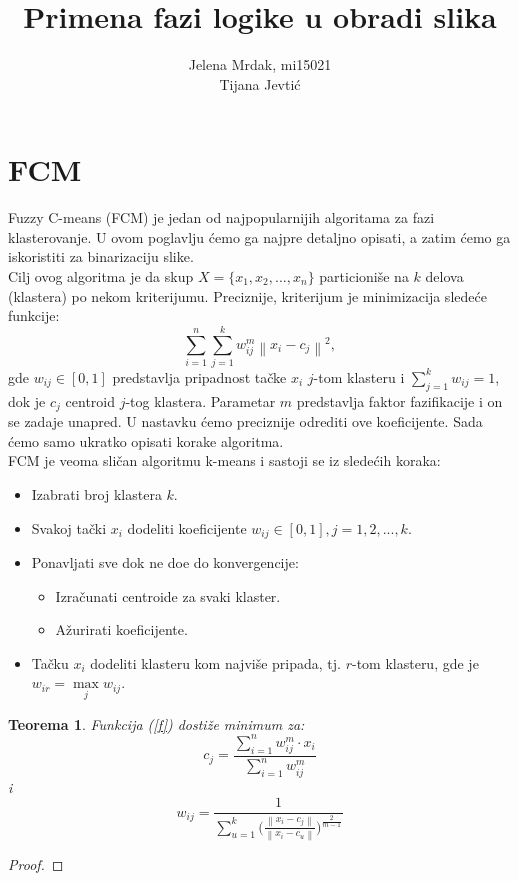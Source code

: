 \documentclass[12pt,a4paper]{article}
\title{Primena fazi logike u obradi slika}
\author{Jelena Mrdak, mi15021\\ Tijana Jevti\' c}
\newtheorem{thm}{Teorema}[section]
\theoremstyle{definition}
\theoremstyle{remark}
\theoremstyle{plain}
\begin{document}
\maketitle
\tableofcontents

\section{FCM}
\label{sec:FCM}
Fuzzy C-means (FCM) je jedan od najpopularnijih algoritama za fazi klasterovanje. U ovom poglavlju \' cemo ga najpre detaljno opisati, a zatim \' cemo ga iskoristiti za binarizaciju slike.\\

Cilj ovog algoritma je da skup $X=\{x_{1}, x_{2}, ..., x_{n}\}$ particioni\v se na $k$ delova (klastera) po 
nekom kriterijumu. Preciznije, kriterijum je minimizacija slede\' ce funkcije:
\begin{equation}\label{f}
  \sum_{i=1}^{n}\sum_{j=1}^{k}w_{ij}^{m}\left\|x_{i}-c_{j}\right\|^{2},
\end{equation}
gde $w_{ij}\in [0, 1]$ predstavlja pripadnost ta\v cke $x_{i}$ $j$-tom klasteru i $\sum_{j=1}^{k}w_{ij}=1$, dok je $c_{j}$ centroid $j$-tog klastera. Parametar $m$ predstavlja faktor fazifikacije i on se zadaje unapred.
U nastavku \' cemo preciznije odrediti ove koeficijente. Sada \' cemo samo ukratko opisati korake algoritma.\\

FCM je veoma sli\v can algoritmu k-means i sastoji se iz slede\' cih koraka:
\begin{itemize}
  \item Izabrati broj klastera $k$.
  \item Svakoj ta\v cki $x_{i}$ dodeliti koeficijente $w_{ij} \in [0, 1], j=1,2,..., k$.
  \item Ponavljati sve dok ne do\dj e do konvergencije:
    \begin{itemize}
      \item Izra\v cunati centroide za svaki klaster.
      \item A\v zurirati koeficijente.
    \end{itemize}
  \item Ta\v cku $x_{i}$ dodeliti klasteru kom najvi\v se pripada, tj. $r$-tom klasteru, gde je $w_{ir}=\max\limits_{j} w_{ij}$.
\end{itemize}

\begin{thm}
  Funkcija (\ref{f}) dosti\v ze minimum za:
  \begin{equation}
    c_{j} = \frac{\sum\limits_{i=1}^{n} w_{ij}^m \cdot x_{i}}{\sum\limits_{i=1}^{n} w_{ij}^{m}}
  \end{equation}
  i
  \begin{equation}
    w_{ij} = \frac{1}{\sum\limits_{u=1}^{k} \biggl(\frac{\left\|x_{i}-c_{j}\right\|}{\left\|x_{i}-c_{u}\right\|}\biggr)^{\frac{2}{m-1}}} 
  \end{equation}
\end{thm}
\begin{proof}
\end{proof}
\end{document}
